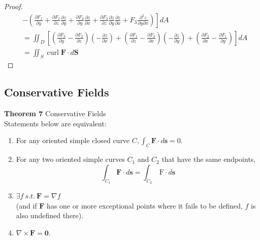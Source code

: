 \documentclass[11pt]{article}
\begin{document}
\begin{proof}
\[\begin{aligned}
        &-\left.\left(\frac{\partial F_{1}}{\partial y}+\frac{\partial F_{1}}{\partial z} \frac{\partial z}{\partial y}+\frac{\partial F_{3}}{\partial y} \frac{\partial z}{\partial x}+\frac{\partial F_{3}}{\partial z} \frac{\partial z}{\partial y} \frac{\partial z}{\partial x}+F_{3} \frac{\partial^{2} z}{\partial y \partial x}\right)\right] d A\\
        &= \iint_{D}\left[\left(\frac{\partial F_{3}}{\partial y}-\frac{\partial F_{2}}{\partial z}\right)\left(-\frac{\partial z}{\partial x}\right)+\left(\frac{\partial F_{1}}{\partial z}-\frac{\partial F_{3}}{\partial x}\right)\left(-\frac{\partial z}{\partial y}\right)+\left(\frac{\partial F_{2}}{\partial x}-\frac{\partial F_{1}}{\partial y}\right)\right] d A\\
        &=\iint_{S} \operatorname{curl} \mathbf{F} \cdot d \mathbf{S}
    \end{aligned}
    \]
\end{proof}

\newpage

\subsection{Conservative Fields}
\textbf{Theorem 7} Conservative Fields\\
Statements below are equivalent:
\begin{enumerate}
    \item[(i)] For any oriented simple closed curve $C, \int_{C} \mathbf{F} \cdot d \mathbf{s}=0$.
    \item[(ii)] For any two oriented simple curves $C_{1}$ and $C_{2}$ that have the same endpoints,
    $$
    \int_{C_{1}} \mathbf{F} \cdot d \mathbf{s}=\int_{C_{2}} \mathrm{~F} \cdot d \mathbf{s}
    $$
    \item[(iii)] $\exists f ~ s.t. ~\mathbf{F}=\nabla f$ 
    \\(and if $\mathbf{F}$ has one or more exceptional points where it fails to be defined, $f$ is also undefined there).
    \item[(iv)] $\nabla \times \mathbf{F}=\mathbf{0}$.
    \\ 
\end{enumerate}
\end{document}
